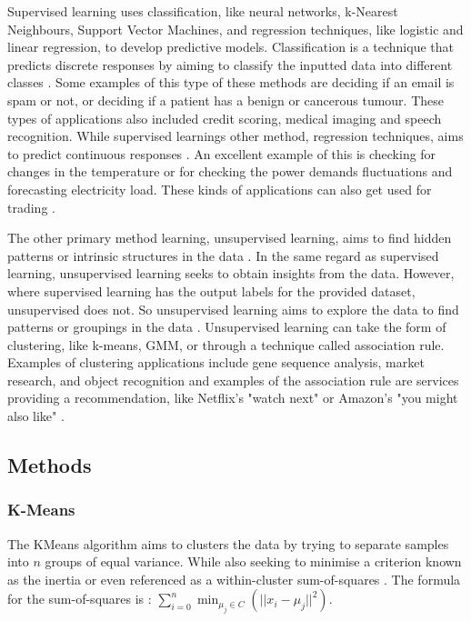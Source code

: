 	Supervised learning uses classification, like neural networks, k-Nearest Neighbours, Support Vector Machines, and regression techniques, like logistic and linear regression, to develop predictive models.  Classification is a technique that predicts discrete responses by aiming to classify the inputted data into different classes \cite{matlanintrotoml}. Some examples of this type of these methods are deciding if an email is spam or not, or deciding if a patient has a benign or cancerous tumour. These types of applications also included credit scoring, medical imaging and speech recognition. While supervised learnings other method, regression techniques, aims to predict continuous responses \cite{geron2019hands}. An excellent example of this is checking for changes in the temperature or for checking the power demands fluctuations and forecasting electricity load. These kinds of applications can also get used for trading  \cite{matlanintrotoml}.
	
	The other primary method learning, unsupervised learning, aims to find hidden patterns or intrinsic structures in the data \cite{geron2019hands}. In the same regard as supervised learning, unsupervised learning seeks to obtain insights from the data. However, where supervised learning has the output labels for the provided dataset, unsupervised does not. So unsupervised learning aims to explore the data to find patterns or groupings in the data \cite{matlanintrotoml}. Unsupervised learning can take the form of clustering, like k-means, GMM, or through a technique called association rule. Examples of clustering applications include gene sequence analysis, market research, and object recognition and examples of the association rule are services providing a recommendation, like Netflix's "watch next" or Amazon's "you might also like" \cite{matlanintrotoml}.
	
	
	\subsection{Methods}
	
	\subsubsection{K-Means}
	The KMeans algorithm aims to clusters the data by trying to separate samples into $n$ groups of equal variance. While also seeking to minimise a criterion known as the inertia or even referenced as a within-cluster sum-of-squares \cite{geron2019hands, sklearn_km}. The formula for the sum-of-squares is \cite{sklearn_km}: $\sum_{i=0}^{n}\min_{\mu_j \in C}(||x_i - \mu_j||^2)$. 
	
